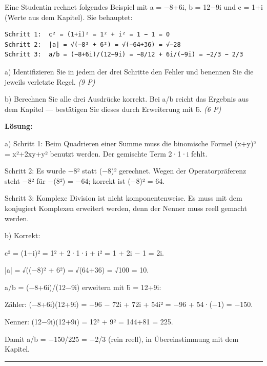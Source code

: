 \documentclass[11pt, a4paper]{article}
\begin{document}
Eine Studentin rechnet folgendes Beispiel mit a = −8+6i, b = 12−9i und c = 1+i (Werte aus dem Kapitel). Sie behauptet:


\begin{lstlisting}
Schritt 1:  c² = (1+i)² = 1² + i² = 1 − 1 = 0
Schritt 2:  |a| = √(−8² + 6²) = √(−64+36) = √−28
Schritt 3:  a/b = (−8+6i)/(12−9i) = −8/12 + 6i/(−9i) = −2/3 − 2/3
\end{lstlisting}


a) Identifizieren Sie in jedem der drei Schritte den Fehler und benennen Sie die jeweils verletzte Regel. \textit{(9 P)}


b) Berechnen Sie alle drei Ausdrücke korrekt. Bei a/b reicht das Ergebnis aus dem Kapitel — bestätigen Sie dieses durch Erweiterung mit b̄. \textit{(6 P)}


\textbf{Lösung:}


a) Schritt 1: Beim Quadrieren einer Summe muss die binomische Formel (x+y)² = x²+2xy+y² benutzt werden. Der gemischte Term 2·1·i fehlt.

Schritt 2: Es wurde −8² statt (−8)² gerechnet. Wegen der Operatorpräferenz steht −8² für −(8²) = −64; korrekt ist (−8)² = 64.

Schritt 3: Komplexe Division ist nicht komponentenweise. Es muss mit dem konjugiert Komplexen erweitert werden, denn der Nenner muss reell gemacht werden.


b) Korrekt:


c² = (1+i)² = 1² + 2·1·i + i² = 1 + 2i − 1 = 2i.


|a| = √((−8)² + 6²) = √(64+36) = √100 = 10.


a/b = (−8+6i)/(12−9i) erweitern mit b̄ = 12+9i:

Zähler: (−8+6i)(12+9i) = −96 − 72i + 72i + 54i² = −96 + 54·(−1) = −150.

Nenner: (12−9i)(12+9i) = 12² + 9² = 144+81 = 225.

Damit a/b = −150/225 = −2/3 (rein reell), in Übereinstimmung mit dem Kapitel.



\noindent\textcolor{rulegray}{\rule{\linewidth}{0.4pt}}





\end{document}
